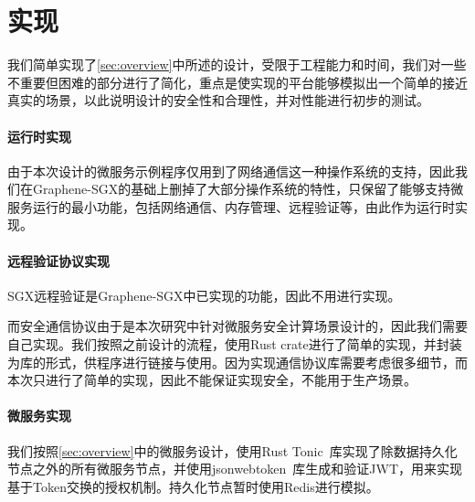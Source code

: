 \section{实现}\label{sec:implimentation}

我们简单实现了\ref{sec:overview}中所述的设计，受限于工程能力和时间，我们对一些不重要但困难的部分进行了简化，重点是使实现的平台能够模拟出一个简单的接近真实的场景，以此说明设计的安全性和合理性，并对性能进行初步的测试。

\paragraph{运行时实现}

由于本次设计的微服务示例程序仅用到了网络通信这一种操作系统的支持，因此我们在Graphene-SGX的基础上删掉了大部分操作系统的特性，只保留了能够支持微服务运行的最小功能，包括网络通信、内存管理、远程验证等，由此作为运行时实现。

\paragraph{远程验证协议实现}

SGX远程验证是Graphene-SGX中已实现的功能，因此不用进行实现。

而安全通信协议由于是本次研究中针对微服务安全计算场景设计的，因此我们需要自己实现。我们按照之前设计的流程，使用Rust crate进行了简单的实现，并封装为库的形式，供程序进行链接与使用。因为实现通信协议库需要考虑很多细节，而本次只进行了简单的实现，因此不能保证实现安全，不能用于生产场景。

\paragraph{微服务实现}

我们按照\ref{sec:overview}中的微服务设计，使用Rust Tonic~\cite{}库实现了除数据持久化节点之外的所有微服务节点，并使用jsonwebtoken~\cite{}库生成和验证JWT，用来实现基于Token交换的授权机制。持久化节点暂时使用Redis进行模拟。
